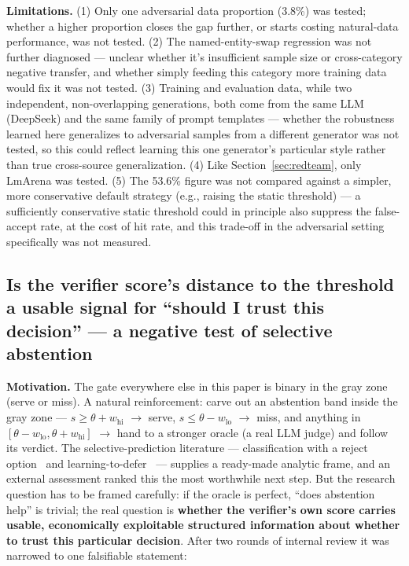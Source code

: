 \documentclass[11pt]{article}
\begin{document}
\textbf{Limitations.} (1) Only one adversarial data proportion (3.8\%) was tested; whether a higher proportion closes the gap further, or starts costing natural-data performance, was not tested. (2) The named-entity-swap regression was not further diagnosed --- unclear whether it's insufficient sample size or cross-category negative transfer, and whether simply feeding this category more training data would fix it was not tested. (3) Training and evaluation data, while two independent, non-overlapping generations, both come from the same LLM (DeepSeek) and the same family of prompt templates --- whether the robustness learned here generalizes to adversarial samples from a different generator was not tested, so this could reflect learning this one generator's particular style rather than true cross-source generalization. (4) Like Section~\ref{sec:redteam}, only LmArena was tested. (5) The 53.6\% figure was not compared against a simpler, more conservative default strategy (e.g., raising the static threshold) --- a sufficiently conservative static threshold could in principle also suppress the false-accept rate, at the cost of hit rate, and this trade-off in the adversarial setting specifically was not measured.

\subsection{Is the verifier score's distance to the threshold a usable signal for ``should I trust this decision'' --- a negative test of selective abstention}
\label{sec:selectdefer}

\textbf{Motivation.} The gate everywhere else in this paper is binary in the gray zone (serve or miss). A natural reinforcement: carve out an abstention band inside the gray zone --- $s \ge \theta + w_\text{hi}$ $\to$ serve, $s \le \theta - w_\text{lo}$ $\to$ miss, and anything in $[\theta - w_\text{lo}, \theta + w_\text{hi}]$ $\to$ hand to a stronger oracle (a real LLM judge) and follow its verdict. The selective-prediction literature --- classification with a reject option~\cite{chow70,elyaniv10,geifman17} and learning-to-defer~\cite{cortes16,mozannar20} --- supplies a ready-made analytic frame, and an external assessment ranked this the most worthwhile next step. But the research question has to be framed carefully: if the oracle is perfect, ``does abstention help'' is trivial; the real question is \textbf{whether the verifier's own score carries usable, economically exploitable structured information about whether to trust this particular decision}. After two rounds of internal review it was narrowed to one falsifiable statement:
\end{document}
